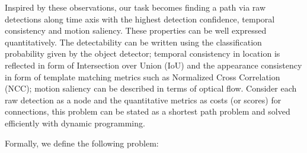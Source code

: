 Inspired by these observations, our task becomes finding a path via raw detections along time axis with the highest detection confidence, temporal consistency and motion saliency. 
These properties can be well expressed quantitatively.
The detectability can be written using the classification probability given by the object detector; 
temporal consistency in location is reflected in form of Intersection over Union (IoU) and the appearance consistency in form of template matching metrics such as Normalized Cross Correlation (NCC); 
motion saliency can be described in terms of optical flow.
Consider each raw detection as a node and the quantitative metrics as costs (or scores) for connections, this problem can be stated as a shortest path problem and solved efficiently with dynamic programming.

Formally, we define the following problem:
